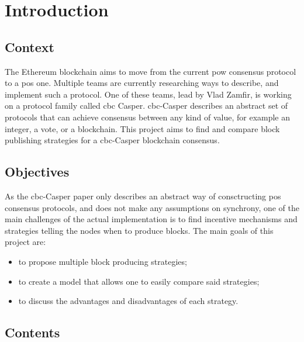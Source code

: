\chapter{Introduction}
\label{chap:introduction}

\section{Context}

The Ethereum blockchain aims to move from the current \gls{pow} consensus
protocol to a \gls{pos} one. Multiple teams are currently researching ways to describe, and implement
such a protocol. One of these teams, lead by Vlad Zamfir, is working on a protocol family called \gls{cbc} Casper.
\gls{cbc}-Casper describes an abstract set of protocols that can achieve consensus between any kind of value, for example
an integer, a vote, or a blockchain. This project aims to find and compare block publishing strategies
for a \gls{cbc}-Casper blockchain consensus.

\section{Objectives}
As the \gls{cbc}-Casper paper only describes an abstract way of consctructing \gls{pos} consensus protocols, and does not
make any assumptions on synchrony, one of the main challenges of the actual implementation is to find
incentive mechanisms and strategies telling the nodes when to produce blocks.
The main goals of this project are:
\begin{itemize}
        \item to propose multiple block producing strategies;
        \item to create a model that allows one to easily compare said strategies;
        \item to discuss the advantages and disadvantages of each strategy.
\end{itemize}

\section{Contents}


